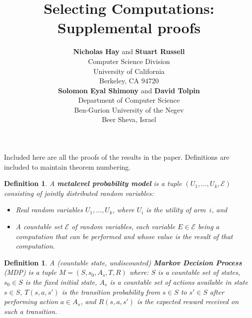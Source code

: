 \documentclass[]{article}
\title{Selecting Computations: Supplemental proofs}
\author{ {\bf Nicholas Hay} and {\bf Stuart Russell} \\   
Computer Science Division \\  
University of California\\ 
Berkeley, CA 94720 \\ 
\And 
{\bf Solomon Eyal Shimony} and {\bf David Tolpin}  \\ 
Department of Computer Science \\ 
Ben-Gurion University of the Negev\\
Beer Sheva, Israel
}
\newcommand {\term}[1] {\textbf{#1}}
\newcommand {\Evidence} {\mathcal{E}}
\newtheorem{dfn}[thm]{Definition}
\begin{document}
	
\maketitle

Included here are all the proofs of the results in the paper.
Definitions are included to maintain theorem numbering.

	\begin{dfn} \label{dfn:metalevel-model}
		A \term{metalevel probability model} is a tuple $(U_1,\dots,U_k,\Evidence)$ 
		consisting of jointly distributed random variables:
		\begin{itemize}
			\item Real random variables $U_1,\dots,U_k$, where $U_i$ is the utility of arm~$i$, and
			\item A countable set $\Evidence$ of random variables, each variable $E\in\Evidence$ being 
			      a computation that can be performed and whose value is the result of that computation.
		\end{itemize}
	\end{dfn}

	\begin{dfn}
	A (countable state, undiscounted) \term{Markov Decision Process} (MDP) is a tuple $M=(S,s_0,A_s,T,R)$ where:
		$S$ is a countable set of states,
		$s_0\in S$ is the fixed initial state,
		$A_s$ is a countable set of actions available in state $s\in S$,
		$T(s,a,s')$ is the transition probability from $s\in S$ to $s'\in S$ after performing action $a\in A_s$,
		and $R(s,a,s')$ is the expected reward received on such a transition.
	\end{dfn}
\end{document}
